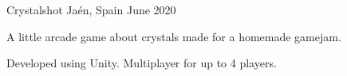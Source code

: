\begin{cventries}
    \cventry
      {}
      {Crystalshot}
      {Jaén, Spain}
      {June 2020}
      {
        \begin{cvitems} %
          \item {A little arcade game about crystals made for a homemade gamejam.}
          \item {Developed using Unity. Multiplayer for up to 4 players.}
        \end{cvitems}
      }
\end{cventries}